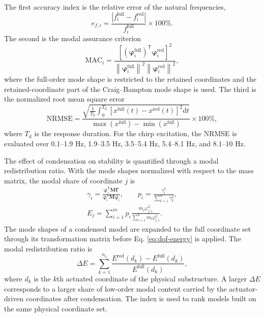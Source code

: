 \documentclass[a4paper,fleqn,review,12pt]{cas-sc}
\numberwithin{equation}{section}
\begin{document}
The first accuracy index is the relative error of the natural frequencies,
\begin{equation}
  e_{f,i}=\frac{\left|f_{i}^{\mathrm{full}}-f_{i}^{\mathrm{red}}\right|}
  {f_{i}^{\mathrm{full}}}\times100\%.
  \label{eq:frequency-error}
\end{equation}
The second is the modal assurance criterion
\begin{equation}
  \mathrm{MAC}_{i}=
  \frac{\left[\left(\bm{\varphi}_{i}^{\mathrm{full}}\right)^{\mathsf{T}}
  \bm{\varphi}_{i}^{\mathrm{red}}\right]^{2}}
  {\left\|\bm{\varphi}_{i}^{\mathrm{full}}\right\|^{2}
  \left\|\bm{\varphi}_{i}^{\mathrm{red}}\right\|^{2}},
  \label{eq:mac}
\end{equation}
where the full-order mode shape is restricted to the retained coordinates and the retained-coordinate part of the Craig--Bampton mode shape is used. The third is the normalized root mean square error
\begin{equation}
  \mathrm{NRMSE}=
  \frac{\displaystyle
  \sqrt{\frac{1}{T_{\mathrm{d}}}\int_{0}^{T_{\mathrm{d}}}
  \left[x^{\mathrm{full}}(t)-x^{\mathrm{red}}(t)\right]^{2}\mathrm{d}t}}
  {\max\left(x^{\mathrm{full}}\right)-\min\left(x^{\mathrm{full}}\right)}
  \times100\%,
  \label{eq:nrmse}
\end{equation}
where \(T_{\mathrm{d}}\) is the response duration. For the chirp excitation, the NRMSE is evaluated over 0.1--1.9 Hz, 1.9--3.5 Hz, 3.5--5.4 Hz, 5.4--8.1 Hz, and 8.1--10 Hz.

The effect of condensation on stability is quantified through a modal redistribution ratio. With the mode shapes normalized with respect to the mass matrix, the modal share of coordinate \(j\) is
\begin{equation}
  \begin{gathered}
    \gamma_{i}=
    \frac{\bm{\varphi}_{i}^{\mathsf{T}}\mathbf{M}\bm{\Gamma}}
    {\bm{\varphi}_{i}^{\mathsf{T}}\mathbf{M}\bm{\varphi}_{i}},
    \qquad
    p_{i}=\frac{\gamma_{i}^{2}}{\displaystyle\sum_{k=1}^{m}\gamma_{k}^{2}},\\[2pt]
    E_{j}=\sum_{i=1}^{m}p_{i}
    \frac{m_{j}\varphi_{j,i}^{2}}
    {\displaystyle\sum_{l=1}^{n}m_{l}\varphi_{l,i}^{2}}.
  \end{gathered}
  \label{eq:dof-energy}
\end{equation}
The mode shapes of a condensed model are expanded to the full coordinate set through its transformation matrix before Eq. \eqref{eq:dof-energy} is applied. The modal redistribution ratio is
\begin{equation}
  \Delta E=\sum_{k=1}^{n_{\mathrm{a}}}
  \frac{E^{\mathrm{red}}(d_{k})-E^{\mathrm{full}}(d_{k})}
  {E^{\mathrm{full}}(d_{k})},
  \label{eq:energy-change}
\end{equation}
where \(d_{k}\) is the \(k\)th actuated coordinate of the physical substructure. A larger \(\Delta E\) corresponds to a larger share of low-order modal content carried by the actuator-driven coordinates after condensation. The index is used to rank models built on the same physical coordinate set.
\end{document}
